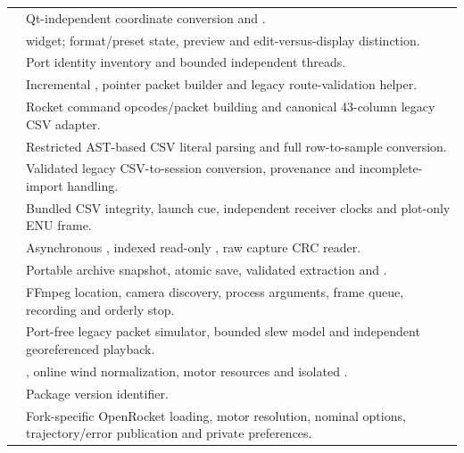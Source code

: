 \begin{longtable}{@{}L{.29\linewidth}L{.64\linewidth}@{}}
 & Qt-independent coordinate conversion and . \\
 &  widget; format/preset state, preview and edit-versus-display distinction. \\
 & Port identity inventory and bounded independent  threads. \\
 & Incremental , pointer packet builder and legacy route-validation helper. \\
 & Rocket command opcodes/packet building and canonical 43-column legacy CSV adapter. \\
 & Restricted AST-based CSV literal parsing and full row-to-sample conversion. \\
 & Validated legacy CSV-to-session conversion, provenance and incomplete-import handling. \\
 & Bundled CSV integrity, launch cue, independent receiver clocks and plot-only ENU frame. \\
 & Asynchronous , indexed read-only , raw capture CRC reader. \\
 & Portable archive snapshot, atomic save, validated extraction and . \\
 & FFmpeg location, camera discovery, process arguments, frame queue, recording and orderly stop. \\
 & Port-free legacy packet simulator, bounded slew model and independent georeferenced  playback. \\
 & , online wind normalization, motor resources and isolated . \\
 & Package version identifier. \\
 & Fork-specific OpenRocket loading, motor resolution, nominal options, trajectory/error publication and private preferences. \\
\bottomrule
\end{longtable}

